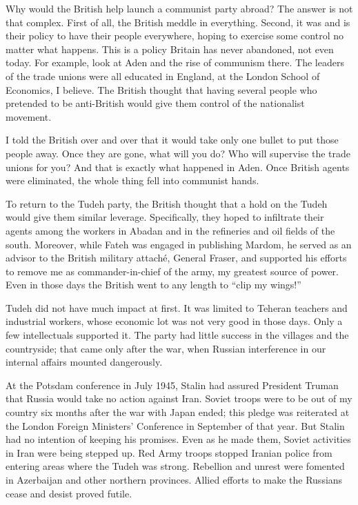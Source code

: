 Why would the British help launch a communist party abroad? The answer is not that complex. First of all, the British meddle in everything. Second, it was and is their policy to have their people everywhere, hoping to exercise some control no matter what happens. This is a policy Britain has never abandoned, not even today. For example, look at Aden and the rise of communism there. The leaders of the trade unions were all educated in England, at the London School of Economics, I believe. The British thought that having several people who pretended to be anti-British would give them control of the nationalist movement. 

I told the British over and over that it would take only one bullet to put those people away. Once they are gone, what will you do? Who will supervise the trade unions for you? And that is exactly what happened in Aden. Once British agents were eliminated, the whole thing fell into communist hands. 

To return to the Tudeh party, the British thought that a hold on the Tudeh would give them similar leverage. Specifically, they hoped to infiltrate their agents among the workers in Abadan and in the refineries and oil fields of the south. Moreover, while Fateh was engaged in publishing Mardom, he served as an advisor to the British military attaché, General Fraser, and supported his efforts to remove me as commander-in-chief of the army, my greatest source of power. Even in those days the British went to any length to “clip my wings!” 

Tudeh did not have much impact at first. It was limited to Teheran teachers and industrial workers, whose economic lot was not very good in those days. Only a few intellectuals supported it. The party had little success in the villages and the countryside; that came only after the war, when Russian interference in our internal affairs mounted dangerously. 

At the Potsdam conference in July 1945, Stalin had assured President Truman that Russia would take no action against Iran. Soviet troops were to be out of my country six months after the war with Japan ended; this pledge was reiterated at the London Foreign Ministers’ Conference in September of that year. But Stalin had no intention of keeping his promises. Even as he made them, Soviet activities in Iran were being stepped up. Red Army troops stopped Iranian police from entering areas where the Tudeh was strong. Rebellion and unrest were fomented in Azerbaijan and other northern provinces. Allied efforts to make the Russians cease and desist proved futile. 

